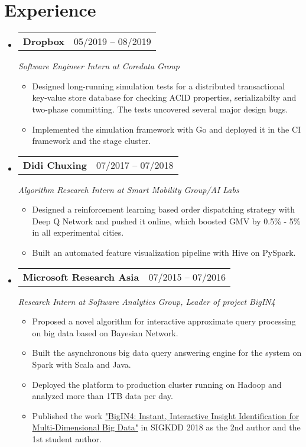 \documentclass[a4paper,11pt]{article}
\makeatletter
\newcommand{\resumeItem}[1]{
  \item\small{#1 \vspace{-2pt}}
}
\newcommand{\resumeSubheading}[3]{
  \vspace{-1pt}\item
    \begin{tabular*}{0.97\textwidth}{l@{\extracolsep{\fill}}r}
      \textbf{#1} & #2
      \end{tabular*}
      \textit{\small#3}
}
\newcommand{\resumeItemListStart}{\begin{itemize}[leftmargin=*, topsep=0ex]}
\newcommand{\resumeItemListEnd}{\end{itemize}}
\makeatother
\begin{document}
\section{Experience}
  \begin{itemize}[leftmargin=*, itemsep=5pt, label={}]

    \resumeSubheading
      {Dropbox}{05/2019 -- 08/2019}
      {Software Engineer Intern at Coredata Group}
      \resumeItemListStart
        \resumeItem
        {Designed long-running simulation tests for a distributed transactional key-value store database for checking ACID properties, serializabilty and two-phase committing. The tests uncovered several major design bugs.}
        \resumeItem
        {Implemented the simulation framework with Go and deployed it in the CI framework and the stage cluster.}
    \resumeItemListEnd

    \resumeSubheading
      {Didi Chuxing}{07/2017 -- 07/2018}
      {Algorithm Research Intern at Smart Mobility Group/AI Labs}
      \resumeItemListStart
        \resumeItem
        {Designed a reinforcement learning based order dispatching strategy with Deep Q Network and pushed it online, which boosted GMV by 0.5\% - 5\% in all experimental cities.}
        \resumeItem
        {Built an automated feature visualization pipeline with Hive on PySpark.}
    \resumeItemListEnd
      
    \resumeSubheading
      {Microsoft Research Asia}{07/2015 -- 07/2016}
      {Research Intern at Software Analytics Group, Leader of project BigIN4}
      \resumeItemListStart
        \resumeItem
        {Proposed a novel algorithm for interactive approximate query processing on big data based on Bayesian Network.}
        \resumeItem
        {Built the asynchronous big data query answering engine for the system on Spark with Scala and Java.}
        \resumeItem
        {Deployed the platform to production cluster running on Hadoop and analyzed more than 1TB data per day.}
        \resumeItem
        {Published the work \href{http://www.kdd.org/kdd2018/accepted-papers/view/bigin4-instant-interactive-insight-identification-for-multi-dimensional-big}{"BigIN4: Instant, Interactive Insight Identification for Multi-Dimensional Big Data"} in SIGKDD 2018 as the 2nd author and the 1st student author.}
      \resumeItemListEnd
  \end{itemize}
  
\end{document}

